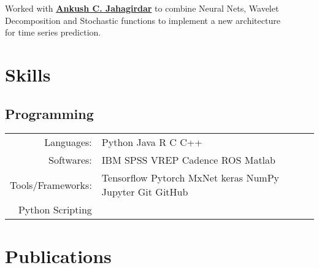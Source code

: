 \documentclass[]{limos-resume-openfont}
\begin{document}
\begin{minipage}[t]{0.66\textwidth}
Worked with \textbf{\href{https://www.bits-pilani.ac.in/pilani/ankushchandrakant/profile}{Ankush C. Jahagirdar}} to combine Neural Nets, Wavelet Decomposition and Stochastic functions to implement a new architecture \\for time series prediction.
\sectionsep



\end{minipage} 


\begin{minipage}[t]{1\textwidth} 


\section{Skills}
\subsection{Programming}
\begin{tabular}{rll}
Languages: & Python \textbullet{} Java \textbullet{} R \textbullet{} C \textbullet{} C++ &\\
Softwares: & IBM SPSS \textbullet{} VREP \textbullet{}  Cadence \textbullet{}ROS \textbullet{} Matlab &\\
Tools/Frameworks: & Tensorflow \textbullet{} Pytorch \textbullet{} MxNet \textbullet{} keras
\textbullet{} NumPy \textbullet{} Jupyter\textbullet{} Git \textbullet{} GitHub &\\
Python Scripting
\end{tabular}
\sectionsep



\section{Publications} 
\renewcommand\refname{\vskip -1.5em} %


\nocite{*}
\begin{multicols}{2}

\end{multicols}
\end{minipage}
\end{document}
